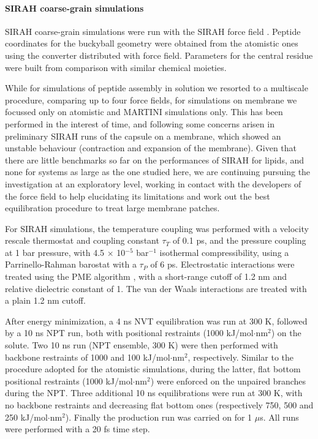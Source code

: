 \paragraph{SIRAH coarse-grain simulations}
SIRAH coarse-grain simulations were run with the SIRAH force field \cite{Machado2018}. Peptide coordinates for the buckyball geometry were obtained from the atomistic ones using the converter distributed with force field. Parameters for the central residue were built from comparison with similar chemical moieties.

While for simulations of peptide assembly in solution we resorted to a multiscale procedure, comparing up to four force fields, for simulations on membrane we focussed only on atomistic and MARTINI simulations only. This has been performed in the interest of time, and following some concerns arisen in preliminary SIRAH runs of the capsule on a membrane, which showed an unstable behaviour (contraction and expansion of the membrane).
%
Given that there are little benchmarks so far on the performances of SIRAH for lipids, and none for systems as large as the one studied here, we are continuing pursuing the investigation at an exploratory level, working in contact with the developers of the force field to help elucidating its limitations and work out the best equilibration procedure to treat large membrane patches.

For SIRAH simulations, the temperature coupling was performed with a velocity rescale thermostat \cite{Bussi2007} and coupling constant $\tau _T$ of 0.1 ps, and the pressure coupling at 1 bar pressure, with 4.5 $\times$ 10$^{-5}$ bar$^{-1}$ isothermal compressibility, using a Parrinello-Rahman barostat \cite{Parrinello1981} with a $\tau _P$ of 6 ps. Electrostatic interactions were treated using the PME algorithm \cite{Essmann1995}, with a short-range cutoff of 1.2 nm and relative dielectric constant of 1. The van der Waals interactions are treated with a plain 1.2 nm cutoff.

After energy minimization, a 4 ns NVT equilibration was run at 300 K, followed by a 10 ns NPT run, both with positional restraints (1000 kJ/mol$\cdot$nm$^2$) on the solute. Two 10 ns run (NPT ensemble, 300 K) were then performed with backbone restraints of 1000 and 100 kJ/mol$\cdot$nm$^2$, respectively. Similar to the procedure adopted for the atomistic simulations, during the latter, flat bottom positional restraints (1000 kJ/mol$\cdot$nm$^2$) were enforced on the unpaired branches during the NPT. Three additional 10 ns equilibrations were run at 300 K, with no backbone restraints and decreasing flat bottom ones (respectively 750, 500 and 250 kJ/mol$\cdot$nm$^2$). Finally the production run was carried on for 1 $\mu$s. All runs were performed with a 20 fs time step.

